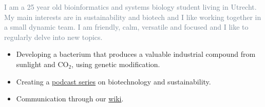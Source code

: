 \documentclass[10pt,a4paper,ragged2e]{altacv}
\begin{document}

\begin{fullwidth}
\makecvheader
\end{fullwidth}


\textcolor{SlateGrey}{I am a 25 year old bioinformatics and systems biology student living in Utrecht. My main interests are in sustainability and biotech and I like working together in a small dynamic team. I am friendly, calm, versatile and focused and I like to regularly delve into new topics.}



\begin{itemize}
\item Developing a bacterium that produces a valuable industrial compound from sunlight and CO$_2$, using genetic modification. 
\item Creating a \href{https://soundcloud.com/user-637672915}{podcast series} on biotechnology and sustainability.
\item Communication through our \href{http://2017.igem.org/Team:Amsterdam}{wiki}.

\end{itemize}
\end{document}
